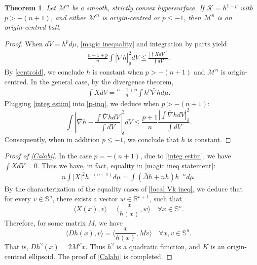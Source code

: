 \documentclass[12pt]{amsart}
\newtheorem{theorem}{Theorem}[section]
\theoremstyle{definition}
\numberwithin{equation}{section}
\newcommand{\M}{\mathcal{M}}
\newcommand{\Rn}{\mathbb{R}^{n+1}}
\newcommand{\Sn}{\mathbb{S}^n}
\theoremstyle{remark}
\numberwithin{equation}{section}
\begin{document}
\begin{theorem} \label{thm:BCD}
Let $\M^n$ be a smooth, strictly convex hypersurface. If $\mathcal{K}=h^{1-p}$ with $p > -(n+1)$, and either $\M^n$ is origin-centred or $p \leq -1$, then $\M^n$ is an origin-centred ball. 
\end{theorem}
\begin{proof}
When $dV = h^p d\mu$, \autoref{magic inequality} and integration by parts yield
\begin{align} \label{p-inq}
\frac{n+1+p}{n}\int |\bar{\nabla} h|_{\bar{g}}^2dV\leq  \frac{\left|\int XdV\right|^2}{\int dV}.
\end{align}
By \autoref{centroid}, we conclude $h$ is constant when $p > -(n+1)$ and $\M^n$ is origin-centred. In the general case, by the divergence theorem,
\begin{align}\label{integ estim}
\int X dV =\frac{n+1+p}{n}\int h^p\bar{\nabla}h d\mu.
\end{align}
Plugging \eqref{integ estim} into \eqref{p-inq}, we deduce when $p > -(n+1)$:
\[\int \left|\bar{\nabla}h-\frac{\int \bar{\nabla}hdV}{\int dV}\right|_{\delta}^2dV\leq \frac{p+1}{n}\frac{|\int \bar{\nabla}hdV|_{\delta}^2}{\int dV}.\]
Consequently, when in addition $p \leq -1$, we conclude that $h$ is constant.
\end{proof}

\begin{proof}[Proof of \autoref{Calabi}]
In the case $p=-(n+1)$, due to \eqref{integ estim}, we have $\int XdV=0$. Thus we have, in fact, equality in \eqref{magic ineq statement}:
\begin{align*}
n\int|X|^2h^{-(n+1)}d\mu= \int  (\bar{\Delta}h+nh)h^{-n}d\mu.
\end{align*}
By the characterization of the equality cases of \eqref{local Vk ineq}, we deduce that for every $v\in \Sn$, there exists a vector $w\in \Rn$, such that
\[\langle X(x),v\rangle=\langle \frac{x}{h(x)},w\rangle\quad \forall x\in \Sn.\]
Therefore, for some matrix $M$, we have
\[\langle Dh(x),v\rangle=\langle \frac{x}{h(x)},Mv\rangle\quad \forall x,v\in \Sn.\]
That is,
$Dh^2(x)=2M^Tx.$
Thus $h^2$ is a quadratic function, and $K$ is an origin-centred ellipsoid. The proof of \autoref{Calabi} is completed.
\end{proof}
\end{document}
